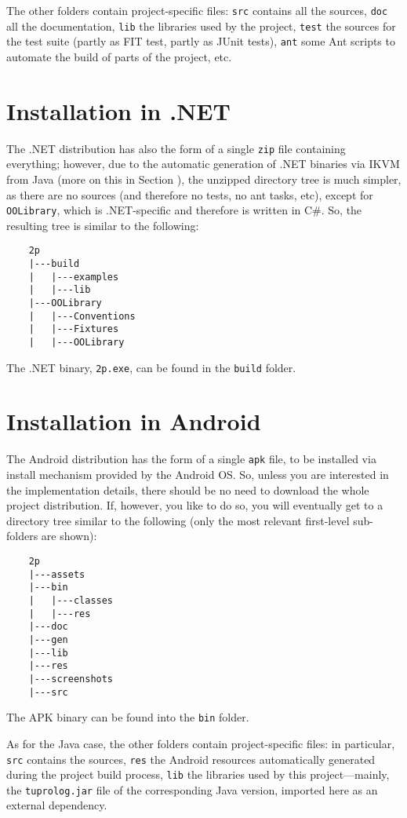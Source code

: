 The other folders contain project-specific files: \texttt{src} contains all the sources, \texttt{doc} all the documentation, \texttt{lib} the libraries used by the \tuprolog{} project, \texttt{test} the sources for the \tuprolog{} test suite (partly as FIT test, partly as JUnit tests), \texttt{ant} some Ant scripts to automate the build of parts of the \tuprolog{} project, etc.


\section{Installation in .NET}

The .NET distribution has also the form of a single \texttt{zip} file containing everything; however, due to the automatic generation of \tuprolog{} .NET binaries via IKVM from Java (more on this in Section ), the unzipped directory tree is much simpler, as there are no sources (and therefore no tests, no ant tasks, etc), except for \texttt{OOLibrary}, which is .NET-specific and therefore is written in C\#.
%
So, the resulting tree is similar to the following:
%
\begin{verbatim}
    2p
    |---build
    |   |---examples
    |   |---lib
    |---OOLibrary
    |   |---Conventions
    |   |---Fixtures
    |   |---OOLibrary
\end{verbatim}
%
The .NET binary, \texttt{2p.exe}, can be found in the \texttt{build} folder.


\section{Installation in Android}

The Android distribution has the form of a single \texttt{apk} file, to be installed via install mechanism provided by the Android OS.
So, unless you are interested in the implementation details, there should be no need to download the whole project distribution.
If, however, you like to do so, you will eventually get to a directory tree similar to the following (only the most relevant first-level sub-folders are shown):
%
\begin{verbatim}
    2p
    |---assets
    |---bin
    |   |---classes
    |   |---res
    |---doc
    |---gen
    |---lib
    |---res
    |---screenshots
    |---src
\end{verbatim}
%
The APK binary can be found into the \texttt{bin} folder.

As for the Java case, the other folders contain project-specific files: in particular, \texttt{src} contains the sources, \texttt{res} the Android resources automatically generated during the project build process, \texttt{lib} the libraries used by this project---mainly, the \texttt{tuprolog.jar} file of the corresponding Java version, imported here as an external dependency.


